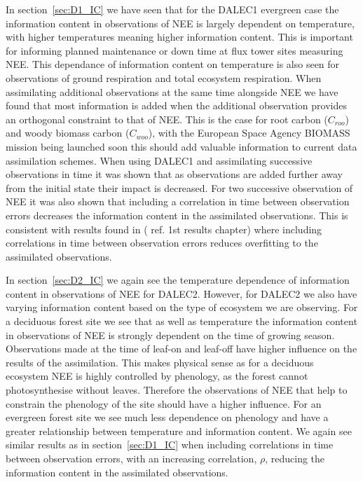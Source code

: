 \documentclass[11pt]{article}
\begin{document}
In section~\ref{sec:D1_IC} we have seen that for the DALEC1 evergreen case the information content in observations of NEE is largely dependent on temperature, with higher temperatures meaning higher information content. This is important for informing planned maintenance or down time at flux tower sites measuring NEE. This dependance of information content on temperature is also seen for observations of ground respiration and total ecosystem respiration. When assimilating additional observations at the same time alongside NEE we have found that most information is added when the additional observation provides an orthogonal constraint to that of NEE. This is the case for root carbon (\(C_{roo}\)) and woody biomass carbon (\(C_{woo}\)), with the European Space Agency BIOMASS mission being launched soon this should add valuable information to current data assimilation schemes. When using DALEC1 and assimilating successive observations in time it was shown that as observations are added further away from the initial state their impact is decreased. For two successive observation of NEE it was also shown that including a correlation in time between observation errors decreases the information content in the assimilated observations. This is consistent with results found in ({\color{red} ref. 1st results chapter}) where including correlations in time between observation errors reduces overfitting to the assimilated observations.

In section~\ref{sec:D2_IC} we again see the temperature dependence of information content in observations of NEE for DALEC2. However, for DALEC2 we also have varying information content based on the type of ecosystem we are observing. For a deciduous forest site we see that as well as temperature the information content in observations of NEE is strongly dependent on the time of growing season. Observations made at the time of leaf-on and leaf-off have higher influence on the results of the assimilation. This makes physical sense as for a deciduous ecosystem NEE is highly controlled by phenology, as the forest cannot photosynthesise without leaves. Therefore the observations of NEE that help to constrain the phenology of the site should have a higher influence. For an evergreen forest site we see much less dependence on phenology and have a greater relationship between temperature and information content. We again see similar results as in section~\ref{sec:D1_IC} when including correlations in time between observation errors, with an increasing correlation, \(\rho\), reducing the information content in the assimilated observations.

{}
\end{document}
